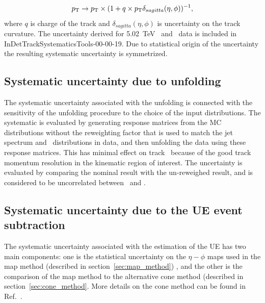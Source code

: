 \begin{equation}
\pt \rightarrow \pt \times (1 + q \times \pt \delta_{sagitta}(\eta, \phi))^{-1},
\end{equation}
where $q$ is charge of the track and $\delta_{sagitta}(\eta, \phi)$ is uncertainty on the track curvature. The uncertainty derived for 5.02~TeV \pp\ and \PbPb\ data is included in InDetTrackSystematicsTools-00-00-19. Due to statistical origin of the uncertainty the resulting systematic uncertainty is symmetrized. 


\subsection{Systematic uncertainty due to unfolding}
The systematic uncertainty associated with the unfolding is connected with the sensitivity of the unfolding procedure to the choice of the input distributions. The systematic is evaluated by generating response matrices from the MC distributions without the reweighting factor that is used to match the jet spectrum and \Dptr\ distributions in data, and then unfolding the data using these response matrices. This has minimal effect on track \pt\ because of the good track momentum resolution in the kinematic region of interest. The uncertainty is evaluated by comparing the nominal result with the un-reweighed result, and is considered to be uncorrelated between \pbpb\ and \pp.


\subsection{Systematic uncertainty due to the UE event subtraction}
The systematic uncertainty associated with the estimation of the UE has two main components: one is the statistical uncertainty on the $\eta-\phi$ maps used in the map method (described in section~\ref{sec:map_method}) , and the other is the comparison of the map method to the alternative cone method (described in section~\ref{sec:cone_method}. More details on the cone method can be found in Ref.~\cite{PbPb5TeVIntNote}. 


